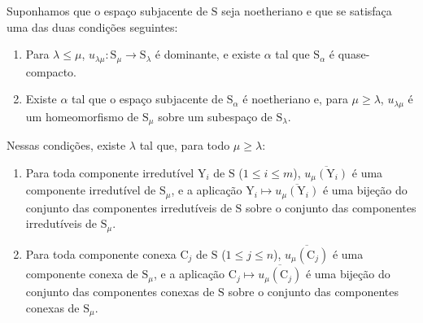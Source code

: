 \begin{proposition}[8.4.2]
\label{IV.8.4.2}
Suponhamos que o espaço subjacente de $\mathrm{S}$ seja noetheriano e que se satisfaça uma das duas condições seguintes:
\begin{enumerate}[label=\emph{\alph*)}]
  \item Para $\lambda\leqslant\mu$, $u_{\lambda\mu}:\mathrm{S}_\mu\to\mathrm{S}_\lambda$ é dominante, e existe $\alpha$ tal que $\mathrm{S}_\alpha$ é quase-compacto.
  \item Existe $\alpha$ tal que o espaço subjacente de $\mathrm{S}_\alpha$ é noetheriano e, para $\mu\geqslant\lambda$, $u_{\lambda\mu}$ é um homeomorfismo de $\mathrm{S}_\mu$ sobre um subespaço de $\mathrm{S}_\lambda$.
\end{enumerate}
Nessas condições, existe $\lambda$ tal que, para todo $\mu\geqslant\lambda$:
\begin{enumerate}[label=(\roman*)]
  \item Para toda componente irredutível $\mathrm{Y}_i$ de $\mathrm{S}$ ($1\leqslant i\leqslant m$), $\overline{u_\mu(\mathrm{Y}_i)}$ é uma componente irredutível de $\mathrm{S}_\mu$, e a aplicação $\mathrm{Y}_i\mapsto\overline{u_\mu(\mathrm{Y}_i)}$ é uma bijeção do conjunto das componentes irredutíveis de $\mathrm{S}$ sobre o conjunto das componentes irredutíveis de $\mathrm{S}_\mu$.
  \item Para toda componente conexa $\mathrm{C}_j$ de $\mathrm{S}$ ($1\leqslant j\leqslant n$), $\overline{u_\mu(\mathrm{C}_j)}$ é uma componente conexa de $\mathrm{S}_\mu$, e a aplicação $\mathrm{C}_j\mapsto\overline{u_\mu(\mathrm{C}_j)}$ é uma bijeção do conjunto das componentes conexas de $\mathrm{S}$ sobre o conjunto das componentes conexas de $\mathrm{S}_\mu$.
\end{enumerate}
\end{proposition}

